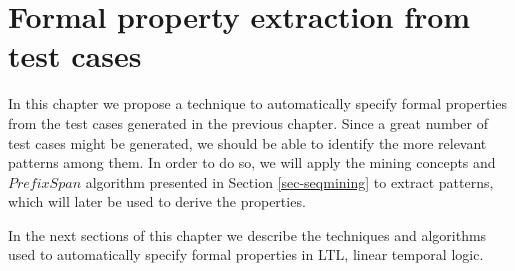 \chapter{Formal property extraction from test cases}
\label{cap:propextract}

In this chapter we propose a technique to automatically specify formal properties from the test cases generated in the previous chapter. Since a great number of test cases might be generated, we should be able to identify the more relevant patterns among them. In order to do so, we will apply the mining concepts and $PrefixSpan$ algorithm presented in Section \ref{sec-seqmining} to extract patterns, which will later be used to derive the properties.

In the next sections of this chapter we describe the techniques and algorithms used to automatically specify formal properties in LTL, linear temporal logic. 




%


%









